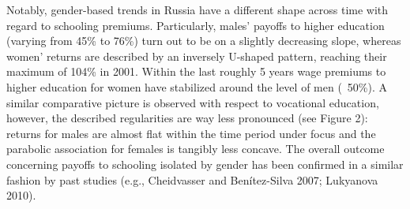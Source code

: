 \documentclass[12pt,a4paper]{article}
\begin{document}
Notably, gender-based trends in Russia have a different shape across time with regard to schooling premiums. Particularly, males' payoffs to higher education (varying from 45\% to 76\%) turn out to be on a slightly decreasing slope, whereas women' returns are described by an inversely U-shaped pattern, reaching their maximum of 104\% in 2001. Within the last roughly 5 years wage premiums to higher education for women have stabilized around the level of men (~50\%). A similar comparative picture is observed with respect to vocational education, however, the described regularities are way less pronounced (see Figure 2): returns for males are almost flat within the time period under focus and the parabolic association for females is tangibly less concave. The overall outcome concerning payoffs to schooling isolated by gender has been confirmed in a similar fashion by past studies (e.g., Cheidvasser and Benítez-Silva 2007; Lukyanova 2010).
\end{document}
